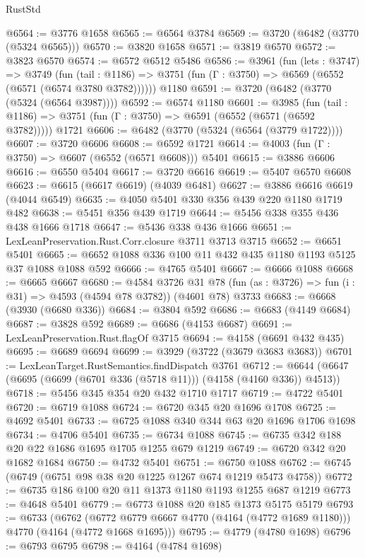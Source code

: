 \begin{lexlean}{RustStd}
\begin{coremodule}
@6564 := @3776 @1658
@6565 := @6564 @3784
@6569 := @3720 (@6482 (@3770 (@5324 @6565)))
@6570 := @3820 @1658
@6571 := @3819 @6570
@6572 := @3823 @6570
@6574 := @6572 @6512 @5486
@6586 := @3961
    (fun (lets : @3747) =>
    @3749
      (fun (tail : @1186) => @3751 (fun (Γ : @3750) => @6569 (@6552 (@6571 (@6574 @3780 @3782))))))
    @1180
@6591 := @3720 (@6482 (@3770 (@5324 (@6564 @3987))))
@6592 := @6574 @1180
@6601 := @3985
    (fun (tail : @1186) => @3751 (fun (Γ : @3750) => @6591 (@6552 (@6571 (@6592 @3782)))))
    @1721
@6606 := @6482 (@3770 (@5324 (@6564 (@3779 @1722))))
@6607 := @3720 @6606
@6608 := @6592 @1721
@6614 := @4003 (fun (Γ : @3750) => @6607 (@6552 (@6571 @6608))) @5401
@6615 := @3886 @6606
@6616 := @6550 @5404
@6617 := @3720 @6616
@6619 := @5407 @6570 @6608
@6623 := @6615 (@6617 @6619) (@4039 @6481)
@6627 := @3886 @6616 @6619 (@4044 @6549)
@6635 := @4050 @5401 @330 @356 @439 @220 @1180 @1719 @482
@6638 := @5451 @356 @439 @1719
@6644 := @5456 @338 @355 @436 @438 @1666 @1718
@6647 := @5436 @338 @436 @1666
@6651 := LexLeanPreservation.Rust.Corr.closure @3711 @3713 @3715
@6652 := @6651 @5401
@6665 := @6652 @1088 @336 @100 @11 @432 @435 @1180 @1193 @5125 @37 @1088 @1088 @592
@6666 := @4765 @5401
@6667 := @6666 @1088
@6668 := @6665 @6667
@6680 := @4584
    @3726
    @31
    @78
    (fun (as : @3726) => fun (i : @31) => @4593 (@4594 @78 @3782))
    (@4601 @78)
    @3733
@6683 := @6668 (@3930 (@6680 @336))
@6684 := @3804 @592
@6686 := @6683 (@4149 @6684)
@6687 := @3828 @592
@6689 := @6686 (@4153 @6687)
@6691 := LexLeanPreservation.Rust.flagOf @3715
@6694 := @4158 (@6691 @432 @435)
@6695 := @6689 @6694
@6699 := @3929 (@3722 (@3679 @3683 @3683))
@6701 := LexLeanTarget.RustSemantics.findDispatch @3761
@6712 := @6644 (@6647 (@6695 (@6699 (@6701 @336 (@5718 @11))) (@4158 (@4160 @336)) @4513))
@6718 := @5456 @345 @354 @20 @432 @1710 @1717
@6719 := @4722 @5401
@6720 := @6719 @1088
@6724 := @6720 @345 @20 @1696 @1708
@6725 := @4692 @5401
@6733 := @6725 @1088 @340 @344 @63 @20 @1696 @1706 @1698
@6734 := @4706 @5401
@6735 := @6734 @1088
@6745 := @6735 @342 @188 @20 @22 @1686 @1695 @1705 @1255 @679 @1219
@6749 := @6720 @342 @20 @1682 @1684
@6750 := @4732 @5401
@6751 := @6750 @1088
@6762 := @6745 (@6749 (@6751 @98 @38 @20 @1225 @1267 @674 @1219 @5473 @4758))
@6772 := @6735 @186 @100 @20 @11 @1373 @1180 @1193 @1255 @687 @1219
@6773 := @4648 @5401
@6779 := @6773 @1088 @20 @185 @1373 @5175 @5179
@6793 := @6733
    (@6762 (@6772 @6779 @6667 @4770 (@4164 (@4772 @1689 @1180))) @4770 (@4164 (@4772 @1668 @1695)))
@6795 := @4779 (@4780 @1698)
@6796 := @6793 @6795
@6798 := @4164 (@4784 @1698)

\end{coremodule}
\end{lexlean}
